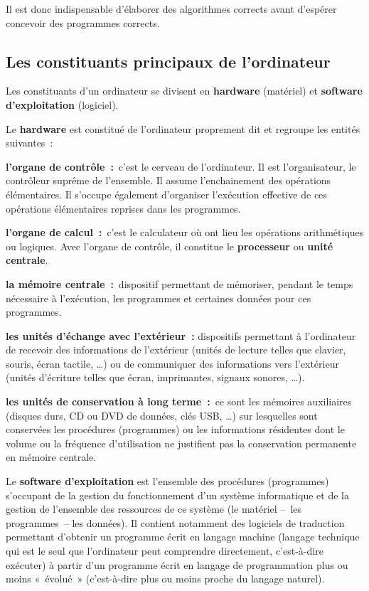 		Il est donc indispensable d’élaborer des algorithmes corrects avant
		d’espérer concevoir des programmes corrects.

	\subsection{Les constituants principaux de l’ordinateur}

		Les constituants d’un ordinateur se divisent en \textbf{hardware}
		(matériel) et \textbf{software d’exploitation} (logiciel).
		
		Le \textbf{hardware} est constitué de l’ordinateur proprement dit et
		regroupe les entités suivantes~:

		\begin{liste}
		\item
			\textbf{l’organe de contrôle~:}~c’est le cerveau de
			l’ordinateur. Il est l’organisateur, le contrôleur
			suprême de l’ensemble. Il assume l’enchainement des opérations
			élémentaires. Il s’occupe également d’organiser l’exécution effective
			de ces opérations élémentaires reprises dans les programmes.
		\item
			\textbf{l’organe de calcul~:}~c’est le calculateur où ont lieu les
			opérations arithmétiques ou logiques. Avec l’organe de contrôle, il
			constitue le \textbf{processeur} ou \textbf{unité centrale}.
		\item
			\textbf{la mémoire centrale~:}~dispositif permettant de mémoriser,
			pendant le temps nécessaire à l’exécution, les programmes et certaines
			données pour ces programmes.
		\item
			\textbf{les unités d’échange avec l’extérieur~:} dispositifs permettant
			à l’ordinateur de recevoir des informations de l’extérieur (unités de
			lecture telles que clavier, souris, écran tactile, \dots) ou de
			communiquer des informations vers l’extérieur (unités d’écriture telles
			que écran, imprimantes, signaux sonores, \dots).
		\item
			\textbf{les unités de conservation à long terme~:}~ce sont les mémoires
			auxiliaires (disques durs, CD ou DVD de données, clés USB, \dots) sur
			lesquelles sont conservées les procédures (programmes) ou les
			informations résidentes dont le volume ou la fréquence d’utilisation ne
			justifient pas la conservation permanente en mémoire centrale.
		\end{liste}
		
		Le \textbf{software d’exploitation} est l’ensemble des procédures
		(programmes) s’occupant de la gestion du fonctionnement d’un système
		informatique et de la gestion de l’ensemble des ressources de ce
		système (le matériel –~les programmes~– les données). Il contient
		notamment des logiciels de traduction permettant d’obtenir un programme
		écrit en langage machine (langage technique qui est le seul que
		l’ordinateur peut comprendre directement, c’est-à-dire exécuter) à
		partir d’un programme écrit en langage de programmation plus ou moins
		«~évolué~» (c’est-à-dire plus ou moins proche du langage naturel).

